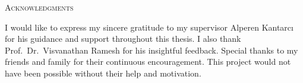 \begin{center}
  \textsc{Acknowledgments}
\end{center}
I would like to express my sincere gratitude to my supervisor Alperen Kantarcı for his guidance and support throughout this thesis. I also thank Prof.\ Dr.\ Visvanathan Ramesh for his insightful feedback. Special thanks to my friends and family for their continuous encouragement. This project would not have been possible without their help and motivation.